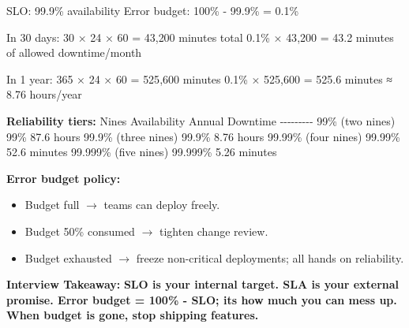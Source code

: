 \documentclass[11pt]{article}
\providecommand{\tightlist}{\setlength{\itemsep}{1pt}\setlength{\parskip}{0pt}}
\newenvironment{Shaded}{\begin{snugshade}}{\end{snugshade}}
\newcommand{\DecValTok}[1]{\textcolor[rgb]{0.96,0.45,0.00}{#1}}
\newcommand{\FloatTok}[1]{\textcolor[rgb]{0.96,0.45,0.00}{#1}}
\newcommand{\NormalTok}[1]{\textcolor[rgb]{0.81,0.81,0.76}{#1}}
\newcommand{\OperatorTok}[1]{\textcolor[rgb]{0.81,0.81,0.76}{#1}}
\begin{document}
\begin{Shaded}
\begin{Highlighting}[]
\NormalTok{SLO: }\FloatTok{99.9}\OperatorTok{\%}\NormalTok{ availability}
\NormalTok{Error budget: }\DecValTok{100}\OperatorTok{\%} \OperatorTok{{-}} \FloatTok{99.9}\OperatorTok{\%} \OperatorTok{=} \FloatTok{0.1}\OperatorTok{\%}

\NormalTok{In }\DecValTok{30}\NormalTok{ days:}
\DecValTok{30}\NormalTok{ × }\DecValTok{24}\NormalTok{ × }\DecValTok{60} \OperatorTok{=} \DecValTok{43}\NormalTok{,}\DecValTok{200}\NormalTok{ minutes total}
\FloatTok{0.1}\OperatorTok{\%}\NormalTok{ × }\DecValTok{43}\NormalTok{,}\DecValTok{200} \OperatorTok{=} \FloatTok{43.2}\NormalTok{ minutes of allowed downtime}\OperatorTok{/}\NormalTok{month}

\NormalTok{In }\DecValTok{1}\NormalTok{ year:}
\DecValTok{365}\NormalTok{ × }\DecValTok{24}\NormalTok{ × }\DecValTok{60} \OperatorTok{=} \DecValTok{525}\NormalTok{,}\DecValTok{600}\NormalTok{ minutes}
\FloatTok{0.1}\OperatorTok{\%}\NormalTok{ × }\DecValTok{525}\NormalTok{,}\DecValTok{600} \OperatorTok{=} \FloatTok{525.6}\NormalTok{ minutes ≈ }\FloatTok{8.76}\NormalTok{ hours}\OperatorTok{/}\NormalTok{year}
\end{Highlighting}
\end{Shaded}

\textbf{Reliability tiers:}
\textbar{} Nines \textbar{} Availability \textbar{} Annual Downtime \textbar{}
\textbar-\/-\/-\textbar-\/-\/-\textbar-\/-\/-\textbar{}
\textbar{} 99\% (two nines) \textbar{} 99\% \textbar{} 87.6 hours \textbar{}
\textbar{} 99.9\% (three nines) \textbar{} 99.9\% \textbar{} 8.76 hours \textbar{}
\textbar{} 99.99\% (four nines) \textbar{} 99.99\% \textbar{} 52.6 minutes \textbar{}
\textbar{} 99.999\% (five nines) \textbar{} 99.999\% \textbar{} 5.26 minutes \textbar{}

\textbf{Error budget policy:}

\begin{itemize}
\tightlist
\item
  Budget full \(\rightarrow\) teams can deploy freely.
\item
  Budget 50\% consumed \(\rightarrow\) tighten change review.
\item
  Budget exhausted \(\rightarrow\) freeze non-critical deployments; all hands on reliability.
\end{itemize}

\textbf{Interview Takeaway:} \textbf{SLO is your internal target. SLA is your external promise. Error budget = 100\% - SLO; it\textquotesingle s how much you can mess up. When budget is gone, stop shipping features.}
\end{document}
